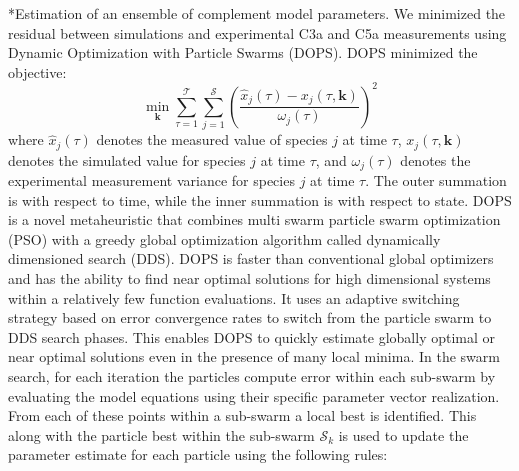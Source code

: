 \documentclass[12pt]{article}
\makeatletter
\renewcommand\subsection{\@startsection
	{subsection}{2}{0mm}
	{-0.05in}
	{-0.5\baselineskip}
	{\normalfont\normalsize\bfseries}}
\makeatother
\begin{document}
\subsection*{Estimation of an ensemble of complement model parameters.}
We minimized the residual between simulations and experimental C3a and C5a measurements using Dynamic Optimization with Particle Swarms (DOPS). DOPS minimized the objective:
\begin{equation}\label{eqn:objective-function}
	\min_{\mathbf{k}} \sum_{\tau=1}^{\mathcal{T}}\sum_{j=1}^{\mathcal{S}}\left(\frac{\hat{x}_{j}\left(\tau\right) - x_{j}\left(\tau,\mathbf{k}\right)}{\omega_{j}\left(\tau\right)}\right)^{2}
\end{equation}where $\hat{x}_{j}\left(\tau\right)$ denotes the measured value of species $j$ at time $\tau$, $x_{j}\left(\tau,\mathbf{k}\right)$ denotes the simulated
value for species $j$ at time $\tau$, and $\omega_{j}\left(\tau\right)$ denotes the experimental measurement variance for species $j$ at time $\tau$. The outer summation is with respect to
time, while the inner summation is with respect to state. DOPS is a novel metaheuristic that combines multi swarm particle swarm optimization (PSO) with a greedy global optimization algorithm called dynamically dimensioned search (DDS).
DOPS is faster than conventional global optimizers and has the ability to find near optimal solutions for high dimensional systems within a relatively few function evaluations.
It uses an adaptive switching strategy based on error convergence rates to switch from the particle swarm to DDS search phases.
This enables DOPS to quickly estimate globally optimal or near optimal solutions even in the presence of many local minima.
In the swarm search, for each iteration the particles compute error within each sub-swarm by evaluating the model equations using their specific parameter vector realization. From each of these points within a sub-swarm a local best is identified. This along with the particle best within the sub-swarm $\mathcal{S}_{k}$ is used to update the parameter estimate for each particle using the following rules:
\end{document}
